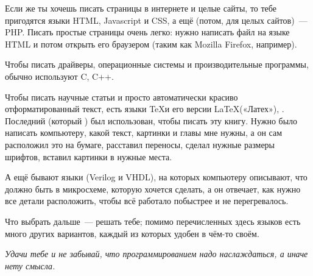 %
%
%
%

Если же ты хочешь писать страницы в интернете и целые сайты, то тебе пригодятся языки HTML, Javascript и CSS, а ещё (потом, для целых сайтов) — PHP. Писать простые страницы очень легко: нужно написать файл на языке HTML и потом открыть его браузером (таким как Mozilla Firefox, например).

Чтобы писать драйверы, операционные системы и производительные программы, обычно используют C, C++.

Чтобы писать научные статьи и просто автоматически красиво отформатированный текст, есть языки \TeX и его версии \LaTeX («Латех»), \XeLaTeX. Последний (который \XeLaTeX) был использован, чтобы писать эту книгу. Нужно было написать компьютеру, какой текст, картинки и главы мне нужны, а он сам расположил это на бумаге, расставил переносы, сделал нужные размеры шрифтов, вставил картинки в нужные места.

А ещё бывают языки (Verilog и VHDL), на которых компьютеру описывают, что должно быть в микросхеме, которую хочется сделать, а он отвечает, как нужно все детали расположить, чтобы всё работало побыстрее и не перегревалось.

Что выбрать дальше — решать тебе; помимо перечисленных здесь языков есть много других вариантов, каждый из которых удобен в чём-то своём.

\emph{Удачи тебе и не забывай, что программированием надо наслаждаться, а иначе нету смысла.}

\newpage
